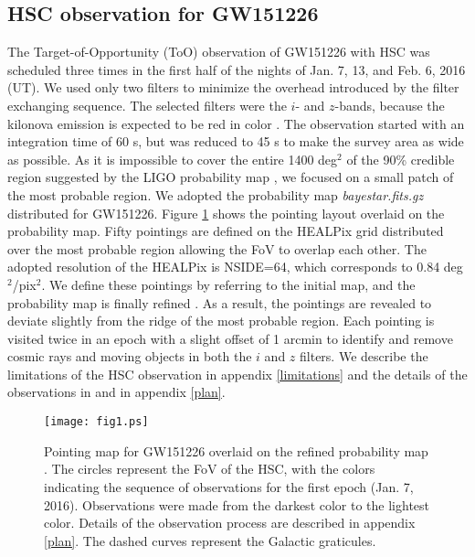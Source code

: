 \documentclass[]{pasj01}
\begin{document}
\subsection{HSC observation for GW151226}
The Target-of-Opportunity (ToO) observation of GW151226 \citep[2015-12-26 03:38:53.648 UTC;][]{GCN18728} with HSC was scheduled three times in the first half of the nights of  Jan. 7, 13, and Feb. 6, 2016 (UT).
We used only two filters to minimize the overhead introduced by the filter exchanging sequence.
The selected filters were the $i$- and $z$-bands, because the kilonova emission is expected to be red in color \citep{2013ApJ...775...18B,2013ApJ...774...25K,2013ApJ...775..113T}.
The observation started with an integration time of 60 s,
but was reduced to 45 s to make the survey area as wide as possible.
As it is impossible to cover the entire 1400 deg$^2$ of the 90\% credible region suggested by the LIGO probability map \citep{GCN18728},
we focused on a small patch of the most probable region.
We adopted the probability map \emph{bayestar.fits.gz} \citep{2016PhRvD..93b4013S}  distributed for GW151226.
Figure \ref{fig:pointingmap} shows the pointing layout overlaid on the probability map.
Fifty pointings are defined on the HEALPix  \citep{2005ApJ...622..759G} grid distributed over the most probable region 
allowing the FoV to overlap each other.
The adopted resolution of the HEALPix is NSIDE=64, which corresponds to 0.84 deg$^2$/pix$^2$.
We define these pointings by referring to the initial map, and the probability map is finally refined \citep{GCN18889}.
As a result, the pointings are revealed to deviate slightly from the ridge of the most probable region.
Each pointing is visited twice in an epoch with a slight offset of 1 arcmin to identify and remove cosmic rays and moving objects in both the $i$ and $z$ filters.
We describe the limitations of the HSC observation in appendix \ref{limitations}
and the details of the observations in \citet{2017PASJ...69....9Y} and in appendix \ref{plan}.

\begin{figure}
 \begin{center}
  \texttt{[image: fig1.ps]} 
 \end{center}
\caption{Pointing map for GW151226 overlaid on the refined  probability map \citep[\emph{LALInference\_skymap.fits.gz};][]{GCN18889}.
The circles represent the FoV of the HSC, with the colors indicating the sequence of observations for the first epoch (Jan. 7, 2016).
Observations were made from the darkest color to the lightest color. Details of the observation process are described in appendix \ref{plan}.
The dashed curves represent the Galactic graticules.}\label{fig:pointingmap}
\end{figure}
\end{document}
